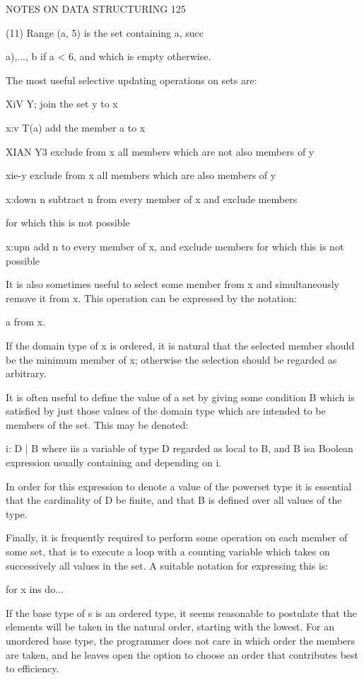 {{{			NOTES ON DATA STRUCTURING 125
			
			(11) Range (a, 5) is the set containing a, succ{a),..., b if a < 6, and which is empty otherwise.
				
				The most useful selective updating operations on sets are:
				
				XiV Y; join the set y to x
				
				x:v T(a) add the member a to x
				
				XIAN Y3 exclude from x all members which are not also members of y
				
				xie-y exclude from x all members which are also members of y
				
				x:down n subtract n from every member of x and exclude members
				
				for which this is not possible
				
				x:upn add n to every member of x, and exclude members for which this is not possible
				
				It is also sometimes useful to select some member from x and simultaneously remove it from x. This operation can be expressed by the notation:
				
				a from x.
				
				If the domain type of x is ordered, it is natural that the selected member should be the minimum member of x; otherwise the selection should be regarded as arbitrary.
				
				It is often useful to define the value of a set by giving some condition B which is satisfied by just those values of the domain type which are intended to be members of the set. This may be denoted:
				
				{i: D | B} where iis a variable of type D regarded as local to B, and B isa Boolean expression usually containing and depending on i.
				
				In order for this expression to denote a value of the powerset type it is essential that the cardinality of D be finite, and that B is defined over all values of the type.
				
				Finally, it is frequently required to perform some operation on each member of some set, that is to execute a loop with a counting variable which takes on successively all values in the set. A suitable notation for expressing this is:
				
				for x ins do...
				
				If the base type of s is an ordered type, it seems reasonable to postulate that the elements will be taken in the natural order, starting with the lowest. For an unordered base type, the programmer does not care in which order the members are taken, and he leaves open the option to choose an order that contributes best to efficiency.
				
}}}}
